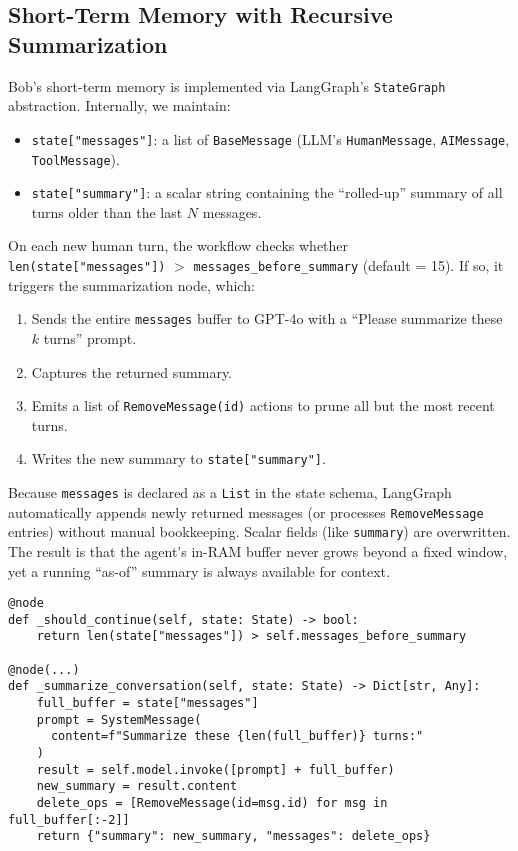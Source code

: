 \documentclass[11pt]{article}
\begin{document}
\subsection{Short-Term Memory with Recursive Summarization}
Bob’s short-term memory is implemented via LangGraph’s \texttt{StateGraph} abstraction. Internally, we maintain:
\begin{itemize}[leftmargin=*]
  \item \texttt{state["messages"]}: a list of \texttt{BaseMessage} (LLM’s \texttt{HumanMessage}, \texttt{AIMessage}, \texttt{ToolMessage}).
  \item \texttt{state["summary"]}: a scalar string containing the “rolled-up” summary of all turns older than the last $N$ messages.
\end{itemize}

On each new human turn, the workflow checks whether \\
 \texttt{len(state["messages"])} $>$ \texttt{messages\_before\_summary} (default = 15). 
If so, it triggers the summarization node, which:
\begin{enumerate}[leftmargin=*]
  \item Sends the entire \texttt{messages} buffer to GPT-4o with a “Please summarize these $k$ turns” prompt.
  \item Captures the returned summary.
  \item Emits a list of \texttt{RemoveMessage(id)} actions to prune all but the most recent turns.
  \item Writes the new summary to \texttt{state["summary"]}.
\end{enumerate}

Because \texttt{messages} is declared as a \texttt{List} in the state schema, LangGraph automatically appends newly returned messages (or processes \texttt{RemoveMessage} entries) without manual bookkeeping. Scalar fields (like \texttt{summary}) are overwritten. The result is that the agent’s in-RAM buffer never grows beyond a fixed window, yet a running “as-of” summary is always available for context.

\begin{verbatim}
@node
def _should_continue(self, state: State) -> bool:
    return len(state["messages"]) > self.messages_before_summary

@node(...)
def _summarize_conversation(self, state: State) -> Dict[str, Any]:
    full_buffer = state["messages"]
    prompt = SystemMessage(
      content=f"Summarize these {len(full_buffer)} turns:"
    )
    result = self.model.invoke([prompt] + full_buffer)
    new_summary = result.content
    delete_ops = [RemoveMessage(id=msg.id) for msg in full_buffer[:-2]]
    return {"summary": new_summary, "messages": delete_ops}
\end{verbatim}
\end{document}
